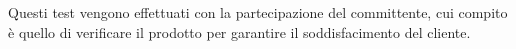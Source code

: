 Questi test vengono effettuati con la partecipazione del committente, cui compito è quello di verificare il prodotto per garantire il soddisfacimento del cliente. 